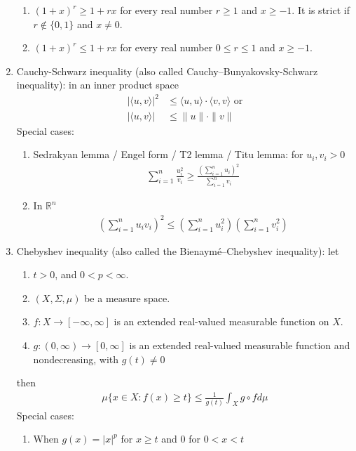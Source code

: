 \documentclass{treatise}
\begin{document}
\begin{shaded}
\begin{theorem}[Inequalities]
\begin{enumerate}
\begin{enumerate}
		\item $(1 + x)^r \geq 1 + rx$ for every real number $r \geq 1$ and $x \geq -1$. It is strict if $r \notin \{ 0, 1 \}$ and $x \neq 0$.
		\item $(1 + x)^r \leq 1 + rx$ for every real number $0 \leq r \leq 1$ and $x \geq -1$.
	\end{enumerate}
	\item Cauchy-Schwarz inequality (also called Cauchy–Bunyakovsky-Schwarz inequality): in an inner product space
	\begin{align*}
	|\langle u, v \rangle|^2 & \leq \langle u, u \rangle \cdot \langle v, v \rangle \mbox{ or}
	\\
	|\langle u, v \rangle| & \leq \| u \| \cdot \| v \|
	\end{align*}
	Special cases:
	\begin{enumerate}
		\item Sedrakyan lemma / Engel form / T2 lemma / Titu lemma: for $u_i, v_i > 0$
		\begin{align*}
		\sum_{i = 1}^n \frac{u_i^2}{v_i} \geq \frac{\left( \sum_{i = 1}^n u_i \right)^2}{\sum_{i = 1}^n v_i}
		\end{align*}
		\item In $\mathbb{R}^n$
		\begin{align*}
		\left( \sum_{i = 1}^n u_i v_i \right)^2 \leq \left( \sum_{i = 1}^n u_i^2 \right) \left( \sum_{i = 1}^n v_i^2 \right)
		\end{align*}
	\end{enumerate}
	\item Chebyshev inequality (also called the Bienaymé–Chebyshev inequality): let
	\begin{enumerate}
		\item $t > 0$, and $0 < p < \infty$.
		\item $(X, \Sigma, \mu)$ be a measure space.
		\item $f: X \to [-\infty, \infty]$ is an extended real-valued measurable function on $X$.
		\item $g: (0, \infty) \to [0, \infty]$ is an extended real-valued measurable function and nondecreasing, with $g(t) \neq 0$
	\end{enumerate}
	then
	\begin{align*}
	\mu \{ x \in X : f(x) \geq t \} \leq \frac{1}{g(t)} \int_X g \circ f d \mu
	\end{align*}
	Special cases:
	\begin{enumerate}
		\item When $g(x) = |x|^p$ for $x \geq t$ and $0$ for $0 < x < t$

\end{enumerate}
\end{enumerate}
\end{theorem}
\end{shaded}
\end{document}
